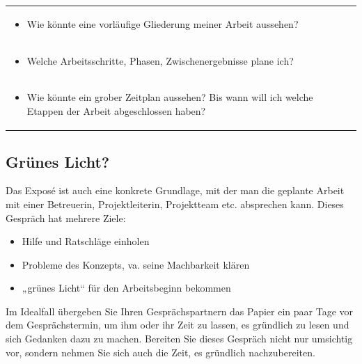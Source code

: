 \documentclass[]{book}
\providecommand{\tightlist}{%
  \setlength{\itemsep}{0pt}\setlength{\parskip}{0pt}}
\theoremstyle{definition}
\theoremstyle{definition}
\theoremstyle{definition}
\theoremstyle{remark}
\begin{document}
\begin{longtable}[]{@{}l@{}}
\begin{minipage}[t]{0.97\columnwidth}
\begin{itemize}
\tightlist
\item
  Wie könnte eine vorläufige Gliederung meiner Arbeit aussehen?
\end{itemize}\strut
\end{minipage}\tabularnewline
\begin{minipage}[t]{0.97\columnwidth}\raggedright\strut
\begin{itemize}
\tightlist
\item
  Welche Arbeitsschritte, Phasen, Zwischenergebnisse plane ich?
\end{itemize}\strut
\end{minipage}\tabularnewline
\begin{minipage}[t]{0.97\columnwidth}\raggedright\strut
\begin{itemize}
\tightlist
\item
  Wie könnte ein grober Zeitplan aussehen? Bis wann will ich welche
  Etappen der Arbeit abgeschlossen haben?
\end{itemize}\strut
\end{minipage}\tabularnewline
\bottomrule
\end{longtable}

\subsection{Grünes Licht?}\label{grunes-licht}

Das Exposé ist auch eine konkrete Grundlage, mit der man die geplante
Arbeit mit einer Betreuerin, Projektleiterin, Projektteam etc.
absprechen kann. Dieses Gespräch hat mehrere Ziele:

\begin{itemize}
\tightlist
\item
  Hilfe und Ratschläge einholen
\item
  Probleme des Konzepts, va. seine Machbarkeit klären
\item
  „grünes Licht`` für den Arbeitsbeginn bekommen
\end{itemize}

Im Idealfall übergeben Sie Ihren Gesprächspartnern das Papier ein paar
Tage vor dem Gesprächstermin, um ihm oder ihr Zeit zu lassen, es
gründlich zu lesen und sich Gedanken dazu zu machen. Bereiten Sie dieses
Gespräch nicht nur umsichtig vor, sondern nehmen Sie sich auch die Zeit,
es gründlich nachzubereiten.
\end{document}
